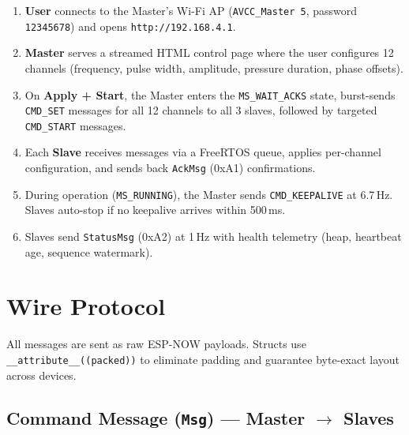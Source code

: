 \documentclass[11pt,a4paper]{article}
\begin{document}
\begin{enumerate}[leftmargin=2cm]
  \item \textbf{User} connects to the Master's Wi-Fi AP (\texttt{AVCC\_Master 5}, password \texttt{12345678}) and opens \texttt{http://192.168.4.1}.
  \item \textbf{Master} serves a streamed HTML control page where the user configures 12 channels (frequency, pulse width, amplitude, pressure duration, phase offsets).
  \item On \textbf{Apply + Start}, the Master enters the \texttt{MS\_WAIT\_ACKS} state, burst-sends \texttt{CMD\_SET} messages for all 12 channels to all 3 slaves, followed by targeted \texttt{CMD\_START} messages.
  \item Each \textbf{Slave} receives messages via a FreeRTOS queue, applies per-channel configuration, and sends back \texttt{AckMsg} (0xA1) confirmations.
  \item During operation (\texttt{MS\_RUNNING}), the Master sends \texttt{CMD\_KEEPALIVE} at 6.7\,Hz. Slaves auto-stop if no keepalive arrives within 500\,ms.
  \item Slaves send \texttt{StatusMsg} (0xA2) at 1\,Hz with health telemetry (heap, heartbeat age, sequence watermark).
\end{enumerate}

\section{Wire Protocol}

All messages are sent as raw ESP-NOW payloads. Structs use
\texttt{\_\_attribute\_\_((packed))} to eliminate padding and guarantee
byte-exact layout across devices.

\subsection{Command Message (\texttt{Msg}) --- Master $\to$ Slaves}
\end{document}
